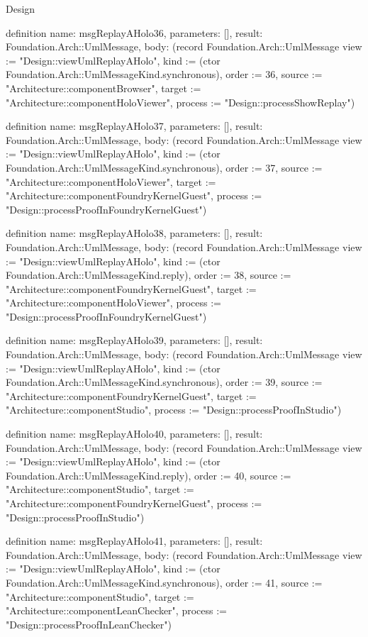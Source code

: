 \begin{lexlean}{Design}
\begin{semanticmodule}
definition{
  name: msgReplayAHolo36,
  parameters: [],
  result: Foundation.Arch::UmlMessage,
  body: (record Foundation.Arch::UmlMessage {view := "Design::viewUmlReplayAHolo", kind := (ctor Foundation.Arch::UmlMessageKind.synchronous), order := 36, source := "Architecture::componentBrowser", target := "Architecture::componentHoloViewer", process := "Design::processShowReplay"})
}

definition{
  name: msgReplayAHolo37,
  parameters: [],
  result: Foundation.Arch::UmlMessage,
  body: (record Foundation.Arch::UmlMessage {view := "Design::viewUmlReplayAHolo", kind := (ctor Foundation.Arch::UmlMessageKind.synchronous), order := 37, source := "Architecture::componentHoloViewer", target := "Architecture::componentFoundryKernelGuest", process := "Design::processProofInFoundryKernelGuest"})
}

definition{
  name: msgReplayAHolo38,
  parameters: [],
  result: Foundation.Arch::UmlMessage,
  body: (record Foundation.Arch::UmlMessage {view := "Design::viewUmlReplayAHolo", kind := (ctor Foundation.Arch::UmlMessageKind.reply), order := 38, source := "Architecture::componentFoundryKernelGuest", target := "Architecture::componentHoloViewer", process := "Design::processProofInFoundryKernelGuest"})
}

definition{
  name: msgReplayAHolo39,
  parameters: [],
  result: Foundation.Arch::UmlMessage,
  body: (record Foundation.Arch::UmlMessage {view := "Design::viewUmlReplayAHolo", kind := (ctor Foundation.Arch::UmlMessageKind.synchronous), order := 39, source := "Architecture::componentFoundryKernelGuest", target := "Architecture::componentStudio", process := "Design::processProofInStudio"})
}

definition{
  name: msgReplayAHolo40,
  parameters: [],
  result: Foundation.Arch::UmlMessage,
  body: (record Foundation.Arch::UmlMessage {view := "Design::viewUmlReplayAHolo", kind := (ctor Foundation.Arch::UmlMessageKind.reply), order := 40, source := "Architecture::componentStudio", target := "Architecture::componentFoundryKernelGuest", process := "Design::processProofInStudio"})
}

definition{
  name: msgReplayAHolo41,
  parameters: [],
  result: Foundation.Arch::UmlMessage,
  body: (record Foundation.Arch::UmlMessage {view := "Design::viewUmlReplayAHolo", kind := (ctor Foundation.Arch::UmlMessageKind.synchronous), order := 41, source := "Architecture::componentStudio", target := "Architecture::componentLeanChecker", process := "Design::processProofInLeanChecker"})
}


\end{semanticmodule}
\end{lexlean}
